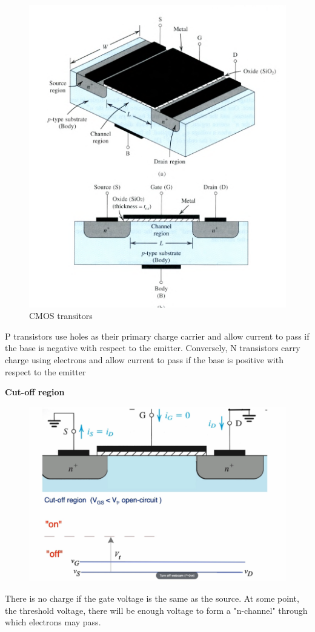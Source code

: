\documentclass[../notes.tex]{subfiles}
\begin{document}
\begin{figure}[H]
	\centering
	\includegraphics[width=0.8\linewidth]{img/img_2022-10-16-something.png}
	\caption{CMOS transitors}
\end{figure}


P transistors use holes as their primary charge carrier and allow current to pass if the base is negative with respect to the emitter.
Conversely, N transistors carry charge using electrons and allow current to pass if the base is positive with respect to the emitter



\begin{definition}
	\textbf{ Cut-off region }


	\begin{figure}[H]
		\centering
		\includegraphics[width=0.8\linewidth]{img/image_2022-10-20-00-47-55.png}
	\end{figure}

	There is no charge if the gate voltage is the same as the source. At some point, the threshold voltage, there will be enough voltage to form a "n-channel" through which electrons may pass.

\end{definition}
\end{document}
